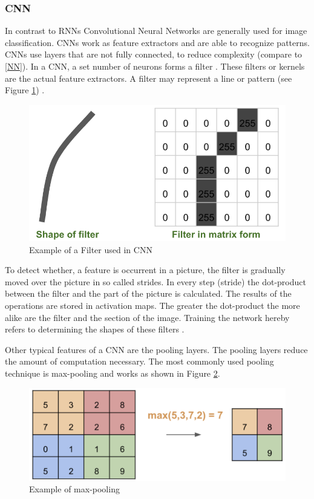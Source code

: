 \subsubsection{CNN} \label{CNN}
In contrast to RNNs Convolutional Neural Networks are generally used for image classification. CNNs work as feature extractors and are able to recognize patterns. CNNs use layers that are not fully connected, to reduce complexity (compare to \ref{NN}). In a CNN, a set number of neurons forms a filter \parencite{LeCun1998}. These filters or kernels are the actual feature extractors. A filter may represent a line or pattern (see Figure \ref{fig:filter}) \parencite{RichStureborg2019}.

\begin{figure}[h]
	\centering
	\includegraphics[scale=0.6]{Figures/filter}
	\decoRule
	\caption[Example of a Filter used in CNN]{Example of a Filter used in CNN \parencite{RichStureborg2019}}
	\label{fig:filter}
\end{figure}

To detect whether, a feature is occurrent in a picture, the filter is gradually moved over the picture in so called strides. In every step (stride) the dot-product between the filter and the part of the picture is calculated. The results of the operations are stored in activation maps.  The greater the dot-product the more alike are the filter and the section of the image. Training the network hereby refers to determining the shapes of these filters \parencite{RichStureborg2019}.

Other typical features of a CNN are the pooling layers. The pooling layers reduce the amount of computation necessary. The most commonly used pooling technique is max-pooling and works as shown in Figure \ref{fig:pooling}.

\begin{figure}[h]
	\centering
	\includegraphics[scale=0.2]{Figures/pooling}
	\decoRule
	\caption[Example of max-pooling]{Example of max-pooling \parencite{RichStureborg2019}}
	\label{fig:pooling}
\end{figure}

